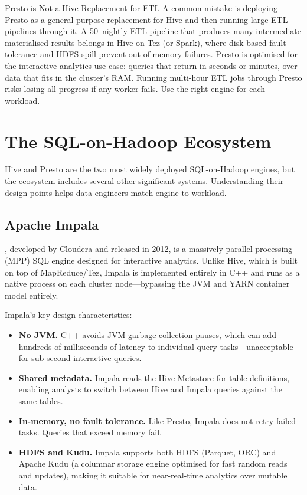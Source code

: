 \begin{caution}{Presto is Not a Hive Replacement for ETL}
A common mistake is deploying Presto as a general-purpose replacement
for Hive and then running large ETL pipelines through it. A 50\TB\
nightly ETL pipeline that produces many intermediate materialised results
belongs in Hive-on-Tez (or Spark), where disk-based fault tolerance
and HDFS spill prevent out-of-memory failures. Presto is optimised for
the interactive analytics use case: queries that return in seconds or
minutes, over data that fits in the cluster's RAM. Running multi-hour
ETL jobs through Presto risks losing all progress if any worker fails.
Use the right engine for each workload.
\end{caution}

\section{The SQL-on-Hadoop Ecosystem}
\label{sec:sql-ecosystem}

Hive and Presto are the two most widely deployed SQL-on-Hadoop engines,
but the ecosystem includes several other significant systems. Understanding
their design points helps data engineers match engine to workload.

\subsection{Apache Impala}
\label{subsec:impala}

, developed by Cloudera and released in 2012, is a
massively parallel processing (MPP) SQL engine designed for interactive
analytics. Unlike Hive, which is built on top of MapReduce/Tez, Impala
is implemented entirely in C++ and runs as a native process on each
cluster node---bypassing the JVM and YARN container model entirely.

Impala's key design characteristics:
\begin{itemize}
  \item \textbf{No JVM.} C++ avoids JVM garbage collection pauses,
        which can add hundreds of milliseconds of latency to individual
        query tasks---unacceptable for sub-second interactive queries.
  \item \textbf{Shared metadata.} Impala reads the Hive Metastore for
        table definitions, enabling analysts to switch between Hive and
        Impala queries against the same tables.
  \item \textbf{In-memory, no fault tolerance.} Like Presto, Impala
        does not retry failed tasks. Queries that exceed memory fail.
  \item \textbf{HDFS and Kudu.} Impala supports both HDFS (Parquet, ORC)
        and Apache Kudu (a columnar storage engine optimised for fast
        random reads and updates), making it suitable for near-real-time
        analytics over mutable data.
\end{itemize}

